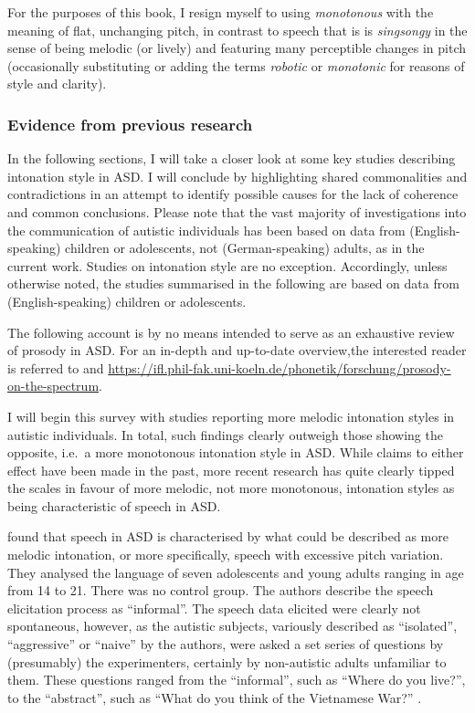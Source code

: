 For the purposes of this book, I resign myself to using \textit{monotonous} with the meaning of flat, unchanging pitch, in contrast to speech that is is \textit{singsongy} in the sense of being melodic (or lively) and featuring many perceptible changes in pitch (occasionally substituting or adding the terms \textit{robotic} or \textit{monotonic} for reasons of style and clarity).

\subsubsection{Evidence from previous research}\label{int_back_ASD_evidence}

In the following sections, I will take a closer look at some key studies describing intonation style in ASD. I will conclude by highlighting shared commonalities and contradictions in an attempt to identify possible causes for the lack of coherence and common conclusions. Please note that the vast majority of investigations into the communication of autistic individuals has been based on data from (English-speaking) children or adolescents, not (German-speaking) adults, as in the current work. Studies on intonation style are no exception. Accordingly, unless otherwise noted, the studies summarised in the following are based on data from (English-speaking) children or adolescents.

The following account is by no means intended to serve as an exhaustive review of prosody in ASD. For an in-depth and up-to-date overview,the interested reader is referred to \citet{griceLinguisticProsodyAutism2023} and \url{https://ifl.phil-fak.uni-koeln.de/phonetik/forschung/prosody-on-the-spectrum}.


\label{int_back_ASD_evidence_singsong}


I will begin this survey with studies reporting more melodic intonation styles in autistic individuals. In total, such findings clearly outweigh those showing the opposite, i.e.~a more monotonous intonation style in ASD. While claims to either effect have been made in the past, more recent research has quite clearly tipped the scales in favour of more melodic, not more monotonous, intonation styles as being characteristic of speech in ASD.

\citet{simmonsLanguagePatternsAdolescent1975} found that speech in ASD is characterised by what could be described as more melodic intonation, or more specifically, speech with excessive pitch variation. They analysed the language of seven adolescents and young adults ranging in age from 14 to 21. There was no control group. The authors describe the speech elicitation process as ``informal''. The speech data elicited were clearly not spontaneous, however, as the autistic subjects, variously described as ``isolated'', ``aggressive'' or ``naive'' by the authors, were asked a set series of questions by (presumably) the experimenters, certainly by non-autistic adults unfamiliar to them. These questions ranged from the ``informal'', such as ``Where do you live?'', to the ``abstract'', such as ``What do you think of the Vietnamese War?'' \citep[p. 336--338]{simmonsLanguagePatternsAdolescent1975}.

